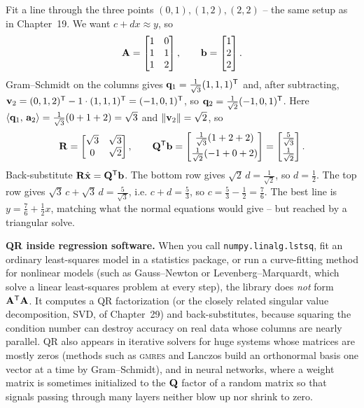 \begin{example}
\label{ch20:ls-example}
Fit a line through the three points $(0,1),(1,2),(2,2)$ -- the same setup as in
Chapter~19. We want $c+dx\approx y$, so
\[
  \mathbf{A}=\begin{bmatrix}1&0\\1&1\\1&2\end{bmatrix},\qquad
  \mathbf{b}=\begin{bmatrix}1\\2\\2\end{bmatrix}.
\]
Gram--Schmidt on the columns gives
$\mathbf{q}_1=\tfrac{1}{\sqrt3}(1,1,1)^{\mathsf{T}}$ and, after subtracting,
$\mathbf{v}_2=(0,1,2)^{\mathsf{T}}-1\cdot(1,1,1)^{\mathsf{T}}=(-1,0,1)^{\mathsf{T}}$, so
$\mathbf{q}_2=\tfrac{1}{\sqrt2}(-1,0,1)^{\mathsf{T}}$. Here
$\langle \mathbf{q}_1,\, \mathbf{a}_2 \rangle=\tfrac{1}{\sqrt3}(0+1+2)=\sqrt3$ and
$\lVert\mathbf{v}_2\rVert=\sqrt2$, so
\[
  \mathbf{R}=\begin{bmatrix}\sqrt3 & \sqrt3\\ 0 & \sqrt2\end{bmatrix},
  \qquad
  \mathbf{Q}^{\mathsf{T}}\mathbf{b}=
  \begin{bmatrix}\tfrac{1}{\sqrt3}(1+2+2)\\[4pt]\tfrac{1}{\sqrt2}(-1+0+2)\end{bmatrix}
  =\begin{bmatrix}\tfrac{5}{\sqrt3}\\[4pt]\tfrac{1}{\sqrt2}\end{bmatrix}.
\]
Back-substitute $\mathbf{R}\hat{\mathbf{x}}=\mathbf{Q}^{\mathsf{T}}\mathbf{b}$. The bottom row gives
$\sqrt2\,d=\tfrac{1}{\sqrt2}$, so $d=\tfrac12$. The top row gives
$\sqrt3\,c+\sqrt3\,d=\tfrac{5}{\sqrt3}$, i.e. $c+d=\tfrac53$, so
$c=\tfrac53-\tfrac12=\tfrac76$. The best line is $y=\tfrac76+\tfrac12 x$, matching what
the normal equations would give -- but reached by a triangular solve.
\end{example}

\begin{applicationbox}
\textbf{QR inside regression software.} When you call
\texttt{numpy.linalg.lstsq}, fit an ordinary least-squares model in a statistics
package, or run a curve-fitting method for nonlinear models (such as Gauss--Newton or
Levenberg--Marquardt, which solve a linear least-squares problem at every step), the
library does \emph{not} form $\mathbf{A}^{\mathsf{T}}\mathbf{A}$.
It computes a QR factorization (or the closely related singular value decomposition,
SVD, of Chapter~29) and back-substitutes, because squaring the condition number can
destroy accuracy on real data whose columns are nearly parallel. QR also appears in
iterative solvers for huge systems whose matrices are mostly zeros (methods such as
\textsc{gmres} and Lanczos build an orthonormal basis one vector at a time by
Gram--Schmidt), and in neural networks, where a weight matrix is sometimes initialized
to the $\mathbf{Q}$ factor of a random matrix so that signals passing through many layers
neither blow up nor shrink to zero.
\end{applicationbox}

